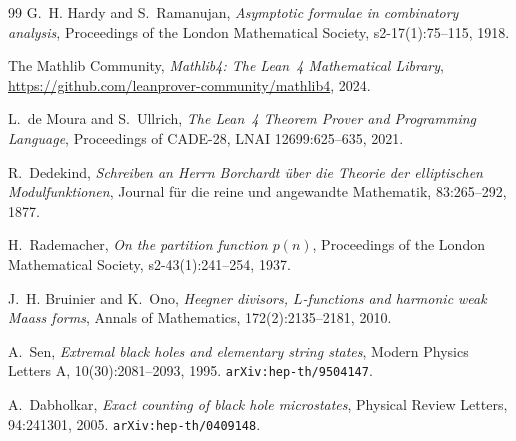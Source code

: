 \documentclass[11pt,a4paper]{article}
\theoremstyle{plain}
\theoremstyle{definition}
\begin{document}
\begin{thebibliography}{99}
G.~H. Hardy and S.~Ramanujan,
\emph{Asymptotic formulae in combinatory analysis},
Proceedings of the London Mathematical Society, s2-17(1):75--115, 1918.

The Mathlib Community,
\emph{Mathlib4: The Lean~4 Mathematical Library},
\url{https://github.com/leanprover-community/mathlib4}, 2024.

L.~de Moura and S.~Ullrich,
\emph{The Lean~4 Theorem Prover and Programming Language},
Proceedings of CADE-28, LNAI 12699:625--635, 2021.

R.~Dedekind,
\emph{Schreiben an Herrn Borchardt \"uber die Theorie der elliptischen Modulfunktionen},
Journal f\"ur die reine und angewandte Mathematik, 83:265--292, 1877.

H.~Rademacher,
\emph{On the partition function $p(n)$},
Proceedings of the London Mathematical Society, s2-43(1):241--254, 1937.

J.~H. Bruinier and K.~Ono,
\emph{Heegner divisors, $L$-functions and harmonic weak Maass forms},
Annals of Mathematics, 172(2):2135--2181, 2010.

A.~Sen,
\emph{Extremal black holes and elementary string states},
Modern Physics Letters A, 10(30):2081--2093, 1995.
\texttt{arXiv:hep-th/9504147}.

A.~Dabholkar,
\emph{Exact counting of black hole microstates},
Physical Review Letters, 94:241301, 2005.
\texttt{arXiv:hep-th/0409148}.

\end{thebibliography}
\end{document}
